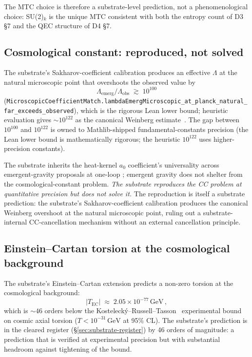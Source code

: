 \documentclass[aps,prd,reprint,nofootinbib,superscriptaddress]{revtex4-2}
\begin{document}
The MTC choice is therefore a substrate-level prediction, not a
phenomenological choice: SU(2)$_k$ is the unique MTC consistent with
both the entropy count of D3 \S 7 and the QEC structure of D4 \S 7.

\subsection{Cosmological constant: reproduced, not solved}

The substrate's Sakharov-coefficient calibration produces an
effective $\Lambda$ at the natural microscopic point that overshoots
the observed value by
\begin{equation}
  \Lambda_{\mathrm{emerg}}/\Lambda_{\mathrm{obs}} \;\gtrsim\; 10^{100}
\end{equation}
(\texttt{MicroscopicCoefficientMatch.lambdaEmergMicroscopic\_at\_planck\_natural\_far\_exceeds\_observed}),
which is the rigorous Lean lower bound; heuristic evaluation gives
$\sim 10^{122}$ as the canonical Weinberg estimate~\cite{Weinberg1989}.
The gap between $10^{100}$ and $10^{122}$ is owned to Mathlib-shipped
fundamental-constants precision (the Lean lower bound is mathematically
rigorous; the heuristic $10^{122}$ uses higher-precision
constants).

The substrate inherits the heat-kernel $a_0$ coefficient's
universality across emergent-gravity proposals at one-loop
\cite{ChristensenDuff1978}; emergent gravity does not shelter from
the cosmological-constant problem. \emph{The substrate reproduces
the CC problem at quantitative precision but does not solve it.}
The reproduction is itself a substrate prediction: the substrate's
Sakharov-coefficient calibration produces the canonical Weinberg
overshoot at the natural microscopic point, ruling out a
substrate-internal CC-cancellation mechanism without an external
cancellation principle.

\subsection{Einstein--Cartan torsion at the cosmological background}

The substrate's Einstein--Cartan extension predicts a non-zero
torsion at the cosmological background:
\begin{equation}
  |T_{\mathrm{EC}}| \;\approx\; 2.05\times 10^{-77}\,\mathrm{GeV}\,,
\end{equation}
which is $\sim 46$ orders below the
Kosteleck\'y--Russell--Tasson~\cite{KosteleckyRussellTasson2008}
experimental bound on cosmic axial torsion ($T < 10^{-31}\,\mathrm{GeV}$
at 95\% CL). The substrate's prediction is in the cleared register
(\S\ref{sec:substrate-register}) by 46 orders of magnitude: a
prediction that is verified at experimental precision but with
substantial headroom against tightening of the bound.
\end{document}
